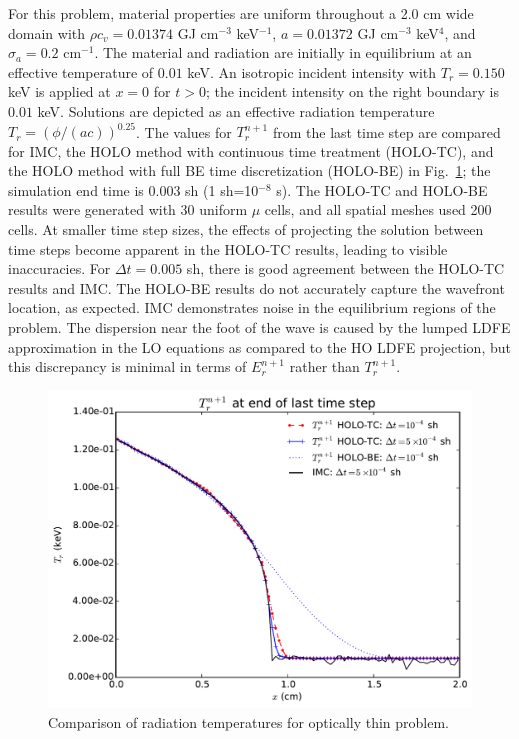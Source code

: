 \documentclass{anstrans}
\newcommand{\invcm}[0]{cm$^{-1}$}
\begin{document}
For this problem, material properties
are uniform throughout a 2.0 cm wide domain with $\rho c_v = 0.01374$ GJ cm$^{-3}$
keV$^{-1}$, $a=0.01372$ GJ cm$^{-3}$ keV$^{4}$, and $\sigma_a=0.2$ \invcm.  
The material and radiation are initially in equilibrium at an effective temperature of $0.01$ keV.
An isotropic incident intensity with $T_r = 0.150$ keV is applied
at $x=0$ for $t>0$; the incident intensity on the right boundary is $0.01$ keV.
 Solutions are depicted as an effective radiation temperature
 $T_r=\left(\phi/(ac)\right)^{0.25}$. The values for $T_r^{n+1}$ from the last
 time step are compared for IMC, the HOLO method with continuous time treatment (HOLO-TC), and
 the HOLO method with full BE time discretization (HOLO-BE) in
 Fig.~\ref{fig:thin_temp_compare}; the simulation end time is 0.003 sh (1 sh=10$^{-8}$ s). The HOLO-TC and HOLO-BE results were generated with 30
uniform $\mu$ cells, and all spatial meshes used 200 cells.  At smaller time step sizes, the
effects of projecting the solution between time steps become apparent in the HOLO-TC
results, leading to visible inaccuracies.  For $\Delta t=0.005$ sh, there is good agreement between
the HOLO-TC results and IMC.  The HOLO-BE results do not accurately capture
the wavefront location, as expected. IMC demonstrates noise in the equilibrium
regions of the problem. The dispersion near the foot of the wave is caused by
the lumped LDFE approximation in the LO equations as compared to the HO LDFE projection, but this discrepancy is minimal in
terms of $E_r^{n+1}$ rather than $T_r^{n+1}$.
\begin{figure}
  \centering
    \includegraphics[width=0.92\linewidth]{thin_temp_compare.pdf}
    \caption{\label{fig:thin_temp_compare} Comparison of radiation temperatures for optically thin
        problem. }
\end{figure}
\end{document}
